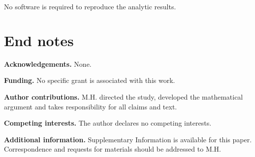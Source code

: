 \documentclass[12pt]{article}
\begin{document}
No software is required to reproduce the analytic results.

\section*{End notes}

\textbf{Acknowledgements.} None.

\textbf{Funding.} No specific grant is associated with this work.

\textbf{Author contributions.} M.H. directed the study, developed the
mathematical argument and takes responsibility for all claims and text.

\textbf{Competing interests.} The author declares no competing interests.

\textbf{Additional information.} Supplementary Information is available for
this paper. Correspondence and requests for materials should be addressed to
M.H.
\end{document}
